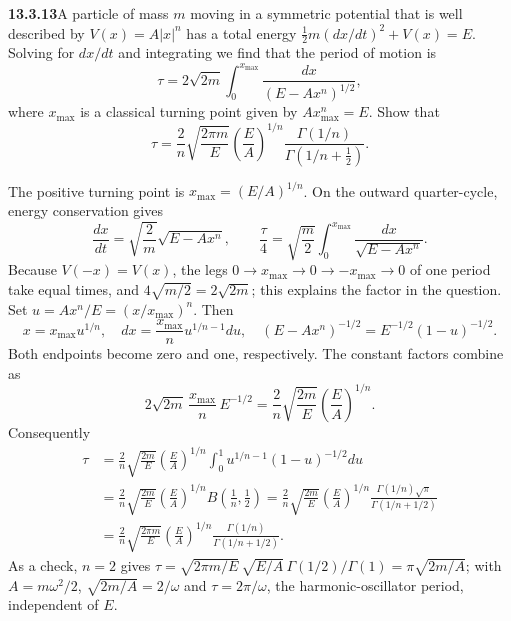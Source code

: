 \par\bigskip
\noindent\textbf{13.3.13}\quad A particle of mass $m$ moving in a symmetric
potential that is well described by $V(x)=A|x|^{n}$ has a total energy
$\frac{1}{2}m(dx/dt)^{2}+V(x)=E$. Solving for $dx/dt$ and integrating we find
that the period of motion is
\[
\tau=2\sqrt{2m}\int_{0}^{x_{\max}}\frac{dx}{(E-Ax^{n})^{1/2}},
\]
where $x_{\max}$ is a classical turning point given by
$Ax_{\max}^{n}=E$. Show that
\[
\tau=\frac{2}{n}\sqrt{\frac{2\pi m}{E}}
\left(\frac{E}{A}\right)^{1/n}
\frac{\Gamma(1/n)}{\Gamma(1/n+\frac{1}{2})}.
\]
\par\smallskip
{}
\solution
{}
The positive turning point is $x_{\max}=(E/A)^{1/n}$.
On the outward quarter-cycle, energy conservation gives
\[
\frac{dx}{dt}=\sqrt{\frac2m}\sqrt{E-Ax^n},
\qquad
\frac\tau4=\sqrt{\frac m2}\int_0^{x_{\max}}
\frac{dx}{\sqrt{E-Ax^n}}.
\]
Because $V(-x)=V(x)$, the legs $0\to x_{\max}\to0\to-x_{\max}\to0$
of one period take equal times, and $4\sqrt{m/2}=2\sqrt{2m}$; this
explains the factor in the question.  Set
$u=Ax^n/E=(x/x_{\max})^n$.  Then
\[
x=x_{\max}u^{1/n},\quad
 dx=\frac{x_{\max}}n u^{1/n-1}du,\quad
(E-Ax^n)^{-1/2}=E^{-1/2}(1-u)^{-1/2}.
\]
Both endpoints become zero and one, respectively.  The constant
factors combine as
\[
2\sqrt{2m}\,\frac{x_{\max}}n\,E^{-1/2}
=\frac2n\sqrt{\frac{2m}E}\left(\frac EA\right)^{1/n}.
\]
Consequently
\begin{align*}
\tau&=\frac2n\sqrt{\frac{2m}E}\left(\frac EA\right)^{1/n}
\int_0^1u^{1/n-1}(1-u)^{-1/2}du\\
&=\frac2n\sqrt{\frac{2m}E}\left(\frac EA\right)^{1/n}
B\left(\frac1n,\frac12\right)
=\frac2n\sqrt{\frac{2m}E}\left(\frac EA\right)^{1/n}
\frac{\Gamma(1/n)\sqrt\pi}{\Gamma(1/n+1/2)}\\
&=\boxed{\frac2n\sqrt{\frac{2\pi m}E}\left(\frac EA\right)^{1/n}
\frac{\Gamma(1/n)}{\Gamma(1/n+1/2)}}.
\end{align*}
As a check, $n=2$ gives
$\tau=\sqrt{2\pi m/E}\,\sqrt{E/A}\,\Gamma(1/2)/\Gamma(1)
=\pi\sqrt{2m/A}$; with $A=m\omega^2/2$, $\sqrt{2m/A}=2/\omega$
and $\tau=2\pi/\omega$, the harmonic-oscillator period,
independent of $E$.


